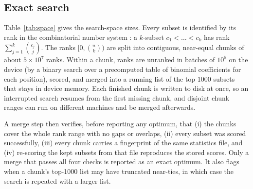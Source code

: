 \documentclass[11pt]{article}
\begin{document}
\subsection{Exact search}
\label{sec:exact}

\begin{table}[t]
\centering
\caption{Size of the search space for $n = \nCandidates$ candidate bands.}
\label{tab:space}

\end{table}

Table~\ref{tab:space} gives the search-space sizes. Every subset is identified
by its rank in the combinatorial number system \citep{knuth2011}: a
$k$-subset $c_1<\dots<c_k$ has rank $\sum_{j=1}^{k}\binom{c_j}{j}$. The ranks
$[0,\binom{n}{k})$ are split into contiguous, near-equal chunks of about
$5\times10^7$ ranks. Within a chunk, ranks are unranked in batches of $10^5$
on the device (by a binary search over a precomputed table of binomial
coefficients for each position), scored, and merged into a running list of the
top 1000 subsets that stays in device memory. Each finished chunk is written to
disk at once, so an interrupted search resumes from the first missing chunk,
and disjoint chunk ranges can run on different machines and be merged
afterwards.

A merge step then verifies, before reporting any optimum, that
(i) the chunks cover the whole rank range with no gaps or overlaps,
(ii) every subset was scored successfully,
(iii) every chunk carries a fingerprint of the same statistics file, and
(iv) re-scoring the kept subsets from that file reproduces the stored
scores. Only a merge that passes all four checks is reported as an
exact optimum. It also flags when a chunk's top-1000 list may have truncated
near-ties, in which case the search is repeated with a larger list.
\end{document}
